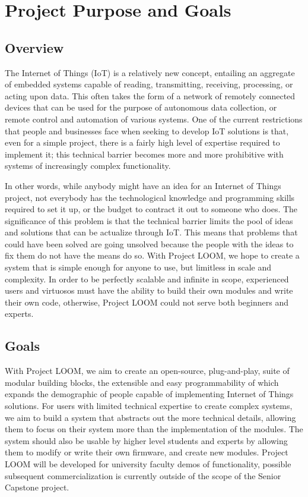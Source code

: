\documentclass[onecolumn, draftclsnofoot,10pt, compsoc]{IEEEtran}
\begin{document}
\section{Project Purpose and Goals}
\subsection{Overview}  
    The Internet of Things (IoT) is a relatively new concept, entailing an aggregate of embedded systems capable of reading, transmitting, receiving, processing, or acting upon data. This often takes the form of a network of remotely connected devices that can be used for the purpose of autonomous data collection, or remote control and automation of various systems. One of the current restrictions that people and businesses face when seeking to develop IoT solutions is that, even for a simple project, there is a fairly high level of expertise required to implement it; this technical barrier becomes more and more prohibitive with systems of increasingly complex functionality.

    In other words, while anybody might have an idea for an Internet of Things project, not everybody has the technological knowledge and programming skills required to set it up, or the budget to contract it out to someone who does. The significance of this problem is that the technical barrier limits the pool of ideas and solutions that can be actualize through IoT. This means that problems that could have been solved are going unsolved because the people with the ideas to fix them do not have the means do so. With Project LOOM, we hope to create a system that is simple enough for anyone to use, but limitless in scale and complexity. In order to be perfectly scalable and infinite in scope, experienced users and virtuosos must have the ability to build their own modules and write their own code, otherwise, Project LOOM could not serve both beginners and experts.


\subsection{Goals}
    With Project LOOM, we aim to create an open-source, plug-and-play, suite of modular building blocks, the extensible and easy programmability of which expands the demographic of people capable of implementing Internet of Things solutions. For users with limited technical expertise to create complex systems, we aim to build a system that abstracts out the more technical details, allowing them to focus on their system more than the implementation of the modules. The system should also be usable by higher level students and experts by allowing them to modify or write their own firmware, and create new modules. Project LOOM will be developed for university faculty demos of functionality, possible subsequent commercialization is currently outside of the scope of the Senior Capstone project.
\end{document}
